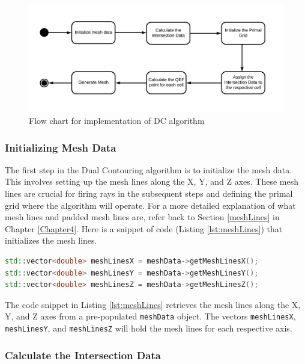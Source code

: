 \begin{figure}[H]
\centering
\includegraphics[width=1.0\textwidth]{Figures/DC-FlowChart.jpeg}
\decoRule
\caption{Flow chart for implementation of DC algorithm}
\label{fig:dc-flow-chart}
\end{figure}

\subsubsection{Initializing Mesh Data}

The first step in the Dual Contouring algorithm is to initialize the mesh data. This involves setting up the mesh lines along the X, Y, and Z axes. These mesh lines are crucial for firing rays in the subsequent steps and defining the primal grid where the algorithm will operate. For a more detailed explanation of what mesh lines and padded mesh lines are, refer back to Section \ref{meshLines} in Chapter \ref{Chapter4}. Here is a snippet of code (Listing \ref{lst:meshLines}) that initializes the mesh lines.

\vspace{2mm}
\begin{lstlisting}[language=C++, caption=Initializing Mesh Data, label=lst:meshLines]
std::vector<double> meshLinesX = meshData->getMeshLinesX();
std::vector<double> meshLinesY = meshData->getMeshLinesY();
std::vector<double> meshLinesZ = meshData->getMeshLinesZ();
\end{lstlisting}

The code snippet in Listing \ref{lst:meshLines} retrieves the mesh lines along the X, Y, and Z axes from a pre-populated \texttt{meshData} object. The vectors \texttt{meshLinesX}, \texttt{meshLinesY}, and \texttt{meshLinesZ} will hold the mesh lines for each respective axis. 

\subsubsection{Calculate the Intersection Data}

